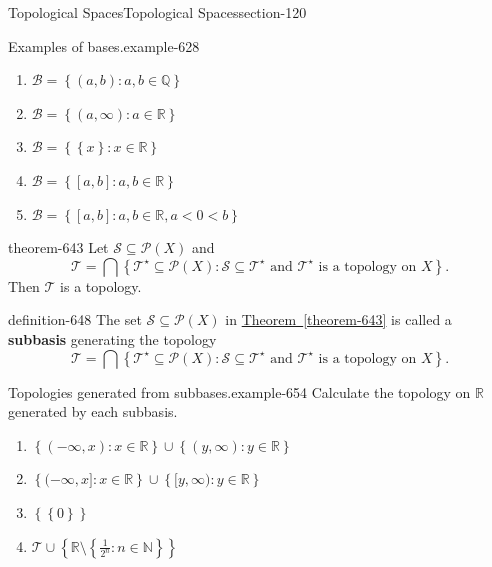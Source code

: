 \documentclass[oneside,10pt,]{article}
\newcommand{\terminology}[1]{\textbf{#1}}
\newcommand{\mb}{\mathbb}
\newcommand{\mc}{\mathcal}
\newcommand{\setBuilder}[2]{\left\{#1:#2\right\}}
\newcommand{\setList}[1]{\left\{#1\right\}}
\newcommand{\lt}{<}
\begin{document}
\begin{sectionptx}{Topological Spaces}{}{Topological Spaces}{}{}{section-120}
\begin{example}{Examples of bases.}{example-628}
\begin{enumerate}
\item\hypertarget{li-633}{}\(\mc B=\setBuilder{(a,b)}{a,b\in\mb Q}\)%
\item\hypertarget{li-635}{}\(\mc B=\setBuilder{(a,\infty)}{a\in\mb R}\)%
\item\hypertarget{li-637}{}\(\mc B=\setBuilder{\setList{x}}{x\in\mb R}\)%
\item\hypertarget{li-639}{}\(\mc B=\setBuilder{[a,b]}{a,b\in\mb R}\)%
\item\hypertarget{li-641}{}\(\mc B=\setBuilder{[a,b]}{a,b\in\mb R,a\lt0\lt b}\)%
\end{enumerate}
\end{example}
\begin{theorem}{}{}{theorem-643}%
\hypertarget{p-644}{}%
Let \(\mc S\subseteq\mc P(X)\) and%
\begin{equation*}
\mc T=\bigcap\setBuilder{\mc T^\star\subseteq\mc P(X)}{\mc S\subseteq\mc T^\star \text{ and }
\mc T^\star \text{ is a topology on } X}.
\end{equation*}
Then \(\mc T\) is a topology.%
\end{theorem}
\begin{definition}{}{definition-648}%
\hypertarget{p-649}{}%
The set \(\mc S\subseteq\mc P(X)\) in \hyperref[theorem-643]{Theorem~\ref{theorem-643}} is called a \terminology{subbasis} generating the topology%
\begin{equation*}
\mc T=\bigcap\setBuilder{\mc T^\star\subseteq\mc P(X)}{\mc S\subseteq\mc T^\star \text{ and }
\mc T^\star \text{ is a topology on } X}.
\end{equation*}
%
\end{definition}
\begin{example}{Topologies generated from subbases.}{example-654}%
\hypertarget{p-656}{}%
Calculate the topology on \(\mb R\) generated by each subbasis.%
\leavevmode%
\begin{enumerate}
\item\hypertarget{li-659}{}\(\setBuilder{(-\infty,x)}{x\in\mb R}\cup\setBuilder{(y,\infty)}{y\in\mb R}\)%
\item\hypertarget{li-661}{}\(\setBuilder{(-\infty,x]}{x\in\mb R}\cup\setBuilder{[y,\infty)}{y\in\mb R}\)%
\item\hypertarget{li-663}{}\(\setList{\setList{0}}\)%
\item\hypertarget{li-665}{}\(\mc T\cup\setList{\mb R\setminus\setBuilder{\frac{1}{2^n}}{n\in\mb N}}\)%
\end{enumerate}
\end{example}

\end{sectionptx}
\end{document}
